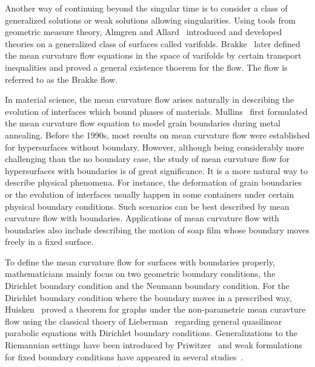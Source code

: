 Another way of continuing beyond the singular time is to consider a class of generalized solutions or weak solutions allowing singularities. Using tools from geometric measure theory, Almgren and Allard~\cite{almgren_plateaus_1966,allard_first_1972} introduced and developed theories on a generalized class of surfaces called varifolds. Brakke~\cite{Brakke_1978} later defined the mean curvature flow equations in the space of varifolds by certain transport inequalities and proved a general existence thoerem for the flow. The flow is referred to as the Brakke flow.

In material science, the mean curvature flow arises naturally in describing the evolution of interfaces which bound phases of materials. Mullins~\cite{mullins_twodimensional_1956} first formulated the mean curvature flow equation to model grain boundaries during metal annealing. Before the 1990s, most results on mean curvature flow were established for hypersurfaces without boundary. However, although being considerably more challenging than the no boundary case, the study of mean curvature flow for hypersurfaces with boundaries is of great significance. It is a more natural way to describe physical phenomena. For instance, the deformation of grain boundaries or the evolution of interfaces usually happen in some containers under certain physical boundary conditions. Such scenarios can be best described by mean curvature flow with boundaries. Applications of mean curvature flow with boundaries also include describing the motion of soap film whose boundary moves freely in a fixed surface.

To define the mean curvature flow for surfaces with boundaries properly, mathematicians mainly focus on two geometric boundary conditions, the Dirichlet boundary condition and the Neumann boundary condition. For the Dirichlet boundary condition where the boundary moves in a prescribed way, Huisken~\cite{huisken_non-parametric_1989} proved a theorem for graphs under the non-parametric mean curavture flow using the classical thoery of Lieberman~\cite{Lieberman_1986} regarding general quasilinear parabolic equations with Dirichlet boundary conditions. Generalizations to the Riemannian settings have been introduced by Priwitzer~\cite{priwitzer_mean_2003} and weak formulations for fixed boundary conditions have appeared in several studies~\cite{stuvard_existence_2021,white2021mean}.

